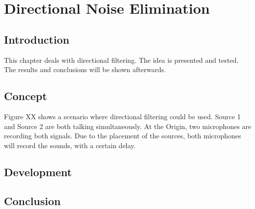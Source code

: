 \chapter{Directional Noise Elimination}\label{ch:directional}
\section{Introduction}
This chapter deals with directional filtering. The idea is presented and tested. The 
results and conclusions will be shown afterwards.
\section{Concept}
Figure XX shows a scenario where directional filtering could be used. Source 1 and Source 2
are both talking simultaneously. At the Origin, two microphones are recording both signals.
Due to the placement of the sources, both microphones will record the sounds, with a 
certain delay.
\section{Development}
\section{Conclusion}